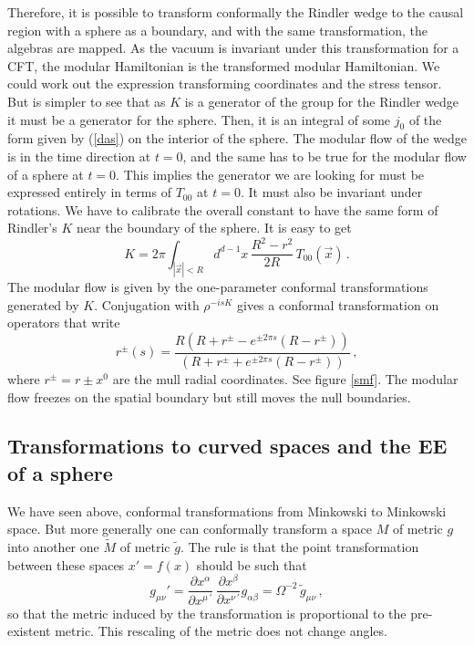 \documentclass[11pt]{article}
\numberwithin{equation}{section}
\newcommand{\be}{\begin{equation}}
\newcommand{\ee}{\end{equation}}
\begin{document}
Therefore, it is possible to transform conformally the Rindler wedge to the causal region with a sphere as a boundary, and with the same transformation, the algebras are mapped. As the vacuum is invariant under this transformation for a CFT, the modular Hamiltonian is the transformed modular Hamiltonian. We could work out the expression transforming coordinates and the stress tensor. But is simpler to see that as $K$ is a generator of the group for the Rindler wedge it must be a generator for the sphere. Then, it is an integral of some $j_0$ of the form given by (\ref{das}) on the interior of the sphere. The modular flow of the wedge is in the time direction at $t=0$, and the same has to be true for the modular flow of a sphere at $t=0$. This implies the generator we are looking for must be expressed entirely in terms of $T_{00}$ at $t=0$. It must also be invariant under rotations. We have to calibrate the overall constant to have the same form of Rindler's $K$ near the boundary of the sphere. It is easy to  get
\be
K=2\pi \int_{|\vec{x}|<R} d^{d-1}x\, \frac{R^2-r^2}{2R}\, T_{00}(\vec{x})\,.\label{modesf}
\ee    
The modular flow is given by the one-parameter conformal transformations generated by $K$. Conjugation with $\rho^{-i s K}$ gives a conformal transformation on operators that write
\be
r^{\pm}(s)=\frac{R(R+r^{\pm}-e^{\pm 2\pi s}(R-r^{\pm}))}{(R+r^{\pm}+e^{\pm 2\pi s}(R-r^{\pm}))}\,,
\ee
where $r^{\pm}=r\pm x^0$ are the mull radial coordinates. See figure \ref{smf}.
The modular flow freezes on the spatial boundary but still moves the null boundaries. 



\subsection{Transformations to curved spaces and the EE of a sphere} 
\label{tow}

We have seen above, conformal transformations from Minkowski to Minkowski space. But more generally one can conformally transform a space $M$ of metric $g$ into another one $\tilde{M}$ of metric $\tilde{g}$. The rule is that the point transformation between these spaces $x'=f(x)$ should be such that
\be
g_{\mu\nu}'=\frac{\partial x^\alpha}{\partial x^{\mu\, '} }\, \frac{\partial x^\beta}{\partial x^{\nu\,'}} g_{\alpha\beta} =\Omega^{-2} \, \tilde{g}_{\mu\nu}\,, 
\ee
so that the metric induced by the transformation is proportional to the pre-existent metric. This rescaling of the metric does not change angles. 
\end{document}
